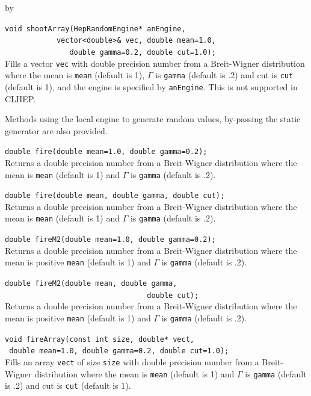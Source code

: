 \documentclass[twoside]{article}
\newcommand{\comp}[1]{\texttt{#1}}%
\newcommand{\entrylabel}[1]{\mbox{\textbf{{#1}}}\hfil}%
\newenvironment{entry}
{\begin{list}{}%
    {\renewcommand{\makelabel}{\entrylabel}%
     \setlength{\labelwidth}{90pt}%
     \setlength{\leftmargin}{\labelwidth}
     \advance\leftmargin by \labelsep%
      }%
    }%
  {\end{list}}
\newcommand{\Entrylabel}[1]%
{\raisebox{0pt}[1ex][0pt]{\makebox[\labelwidth][l]%
    {\parbox[t]{\labelwidth}{\hspace{0pt}\textbf{{#1}}}}}}
\newenvironment{Entry}%
{\renewcommand{\entrylabel}{\Entrylabel}\begin{entry}}%
  {\end{entry}}
\begin{document}
\begin{Entry}
    \verb+void shootArray(HepRandomEngine* anEngine,+\\
    \verb+            vector<double>& vec, double mean=1.0,+\\
    \verb+               double gamma=0.2, double cut=1.0);+\\
    Fills a vector \comp{vec} with double
    precision number from a Breit-Wigner
    distribution where the mean is \comp{mean} (default is 1),
    $\Gamma$ is \comp{gamma} (default is .2) and cut is
    \comp{cut} (default is 1), and the engine is specified
    by \comp{anEngine}.  This is not supported in CLHEP.
    
    Methods using the local engine to generate random values, by-passing
    the static generator are also provided.
    
    \verb+double fire(double mean=1.0, double gamma=0.2);+\\
    Returns a double precision number from a Breit-Wigner
    distribution where the mean is \comp{mean} (default is 1)
    and $\Gamma$ is \comp{gamma} (default is .2).
    
    \verb+double fire(double mean, double gamma, double cut);+\\
    Returns a double precision number from a Breit-Wigner
    distribution where the mean is \comp{mean} (default is 1)
    and $\Gamma$ is \comp{gamma} (default is .2).
    
    \verb+double fireM2(double mean=1.0, double gamma=0.2);+\\
    Returns a double precision number from a Breit-Wigner
    distribution where the mean is positive \comp{mean} (default is 1)
    and $\Gamma$ is \comp{gamma} (default is .2).
    
    \verb+double fireM2(double mean, double gamma,+\\
    \verb+                                 double cut);+\\
    Returns a double precision number from a Breit-Wigner
    distribution where the mean is positive \comp{mean} (default is 1)
    and $\Gamma$ is \comp{gamma} (default is .2).
    
    \verb+void fireArray(const int size, double* vect,+\\
    \verb+ double mean=1.0, double gamma=0.2, double cut=1.0);+\\
     Fills an array \comp{vect} of size \comp{size} with double
    precision number from a Breit-Wigner
    distribution where the mean is \comp{mean} (default is 1)
    and $\Gamma$ is \comp{gamma} (default is .2) and cut is
    \comp{cut} (default is 1).


\end{Entry}
\end{document}
